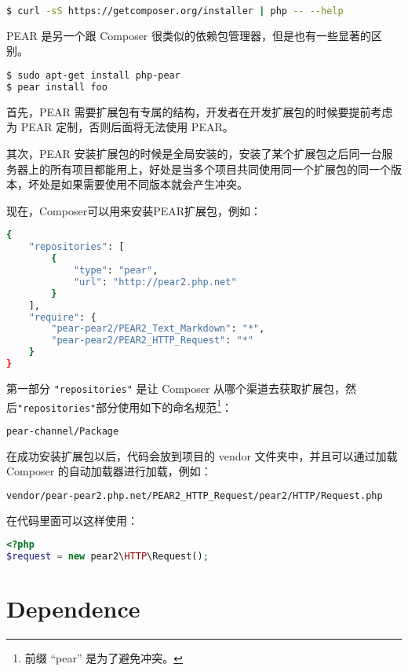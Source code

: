 \begin{lstlisting}[language=bash]
$ curl -sS https://getcomposer.org/installer | php -- --help
\end{lstlisting}

PEAR 是另一个跟 Composer 很类似的依赖包管理器，但是也有一些显著的区别。

\begin{lstlisting}[language=bash]
$ sudo apt-get install php-pear
$ pear install foo
\end{lstlisting}

首先，PEAR 需要扩展包有专属的结构，开发者在开发扩展包的时候要提前考虑为 PEAR 定制，否则后面将无法使用 PEAR。

其次，PEAR 安装扩展包的时候是全局安装的，安装了某个扩展包之后同一台服务器上的所有项目都能用上，好处是当多个项目共同使用同一个扩展包的同一个版本，坏处是如果需要使用不同版本就会产生冲突。

现在，Composer可以用来安装PEAR扩展包，例如：


\begin{lstlisting}[language=bash]
{
    "repositories": [
        {
            "type": "pear",
            "url": "http://pear2.php.net"
        }
    ],
    "require": {
        "pear-pear2/PEAR2_Text_Markdown": "*",
        "pear-pear2/PEAR2_HTTP_Request": "*"
    }
}
\end{lstlisting}

第一部分 \texttt{"repositories"} 是让 Composer 从哪个渠道去获取扩展包，然后\texttt{"repositories"}部分使用如下的命名规范\footnote{前缀 “pear” 是为了避免冲突。}：


\begin{lstlisting}[language=bash]
pear-channel/Package
\end{lstlisting}

在成功安装扩展包以后，代码会放到项目的 vendor 文件夹中，并且可以通过加载 Composer 的自动加载器进行加载，例如：

\begin{lstlisting}[language=bash]
vendor/pear-pear2.php.net/PEAR2_HTTP_Request/pear2/HTTP/Request.php
\end{lstlisting}

在代码里面可以这样使用：

\begin{lstlisting}[language=PHP]
<?php
$request = new pear2\HTTP\Request();
\end{lstlisting}


\section{Dependence}

